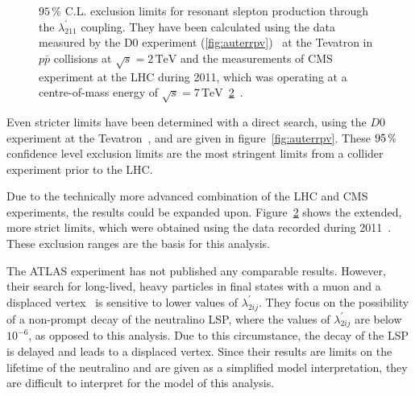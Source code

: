 \begin{figure}[!htbp]
\begin{subfigure}[b]{0.77\textwidth}
    \caption{\label{fig:2011rpv}}
  \end{subfigure}
  \caption{$95\,\%$ C.L. exclusion limits for resonant slepton production through the $\lambda^{\prime}_{211}$ coupling. They have been calculated using the data measured by the D0 experiment (\ref{fig:auterrpv})~\cite{auter} at the Tevatron in $p\bar{p}$ collisions at $\sqrt{s} = 2\,\text{TeV}$ and the measurements of CMS experiment at the LHC during 2011, which was operating at a centre-of-mass energy of $\sqrt{s} = 7\,\text{TeV}$~\ref{fig:2011rpv}~\cite{2011rpv}.}
\end{figure}

Even stricter limits have been determined with a direct search, using the $D0$ experiment at the Tevatron~\cite{auter,d0rpv}, and are given in figure~\ref{fig:auterrpv}. These $95\,\pct$ confidence level exclusion limits are the most stringent limits from a collider experiment prior to the LHC.

Due to the technically more advanced combination of the LHC and CMS experiments, the results could be expanded upon. Figure~\ref{fig:2011rpv} shows the extended, more strict limits, which were obtained using the data recorded during 2011~\cite{2011rpv}. These exclusion ranges are the basis for this analysis.

The ATLAS experiment has not published any comparable results. However, their search for long-lived, heavy particles in final states with a muon and a displaced vertex~\cite{atlasrpv} is sensitive to lower values of $\lambda^\prime_{2ij}$. They focus on the possibility of a non-prompt decay of the neutralino LSP, where the values of $\lambda^\prime_{2ij}$ are below $10^{-6}$, as opposed to this analysis. Due to this circumstance, the decay of the LSP is delayed and leads to a displaced vertex. Since their results are limits on the lifetime of the neutralino and are given as a simplified model interpretation, they are difficult to interpret for the model of this analysis.



